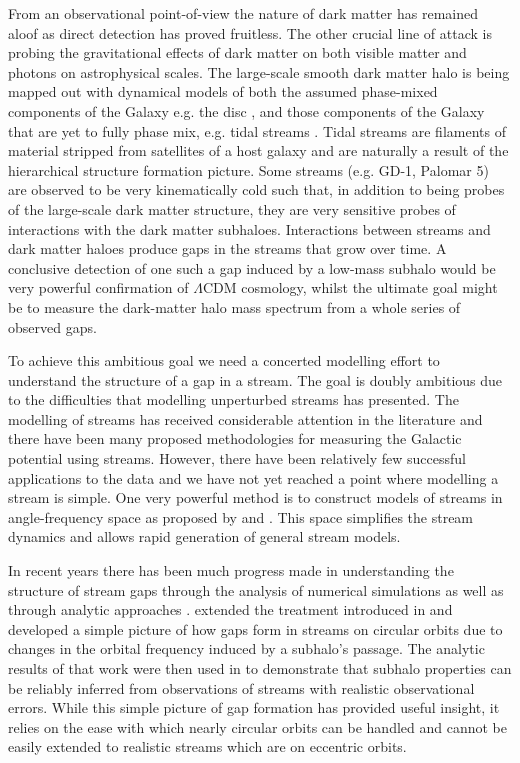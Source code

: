\documentclass[useAMS,usenatbib,fleqn,a4paper]{mn2e}
\begin{document}
From an observational point-of-view the nature of dark matter has remained aloof as direct detection has proved fruitless. The other crucial line of attack is probing the gravitational effects of dark matter on both visible matter and photons on astrophysical scales. The large-scale smooth dark matter halo is being mapped out with dynamical models of both the assumed phase-mixed components of the Galaxy e.g. the disc \citep[e.g.][]{BovyRix2013, Piffl2014}, and those components of the Galaxy that are yet to fully phase mix, e.g. tidal streams \citep[e.g.][]{Koposov2010,Gibbons2014,Kuepper2015,Bowden2015}. Tidal streams are filaments of material stripped from satellites of a host galaxy and are naturally a result of the hierarchical structure formation picture. Some streams (e.g. GD-1, Palomar 5) are observed to be very kinematically cold such that, in addition to being probes of the large-scale dark matter structure, they are very sensitive probes of interactions with the dark matter subhaloes. Interactions between streams and dark matter haloes produce gaps in the streams that grow over time. A conclusive detection of one such a gap induced by a low-mass subhalo would be very powerful confirmation of $\Lambda$CDM cosmology, whilst the ultimate goal might be to measure the dark-matter halo mass spectrum from a whole series of observed gaps.

To achieve this ambitious goal we need a concerted modelling effort to understand the structure of a gap in a stream. The goal is doubly ambitious due to the difficulties that modelling unperturbed streams has presented. The modelling of streams has received considerable attention in the literature and there have been many proposed methodologies for measuring the Galactic potential using streams. However, there have been relatively few successful applications to the data \citep[e.g.][]{Koposov2010,LawMajewski2010,Gibbons2014,Kuepper2015,Bowden2015} and we have not yet reached a point where modelling a stream is simple. One very powerful method is to construct models of streams in angle-frequency space as proposed by \cite{Bovy2014} and \cite{Sanders2014}. This space simplifies the stream dynamics \citep{HelmiWhite1999,Tremaine1999} and allows rapid generation of general stream models.

In recent years there has been much progress made in understanding the structure of stream gaps through the analysis of numerical simulations \citep{SiegalGaskins2008,Carlberg2009,YoonJohnstonHogg,Carlberg2012} as well as through analytic approaches \citep{Carlberg2013,ErkalBelokurov2015,ErkalBelokurov2015b}. \cite{ErkalBelokurov2015} extended the treatment introduced in \cite{Carlberg2013} and developed a simple picture of how gaps form in streams on circular orbits due to changes in the orbital frequency induced by a subhalo's passage. The analytic results of that work were then used in \citep{ErkalBelokurov2015b} to demonstrate that subhalo properties can be reliably inferred from observations of streams with realistic observational errors. While this simple picture of gap formation has provided useful insight, it relies on the ease with which nearly circular orbits can be handled and cannot be easily extended to realistic streams which are on eccentric orbits.
\end{document}
